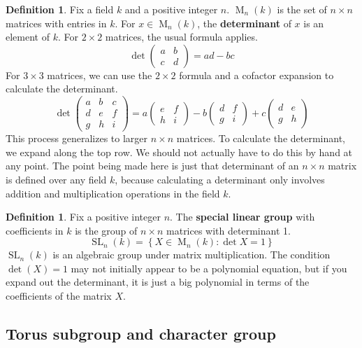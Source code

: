 \documentclass[12pt]{article}
\theoremstyle{definition}
\newtheorem{definition}[theorem]{Definition}
\numberwithin{theorem}{subsection}
\newcommand{\lb}{\left\{}
\newcommand{\rb}{\right\}}
\newcommand{\tbf}{\textbf}
\DeclareMathOperator{\M}{M}
\DeclareMathOperator{\SL}{SL}
\begin{document}
\begin{definition}
Fix a field $k$ and a positive integer $n$. $\M_n(k)$ is the set of $n \times n$ matrices with entries in $k$. For $x \in \M_n(k)$, the \tbf{determinant} of $x$ is an element of $k$. For $2 \times 2$ matrices, the usual formula applies.
\[
	\det
	\begin{pmatrix}
		a & b \\
		c & d
	\end{pmatrix}
	= ad - bc
\]
For $3 \times 3$ matrices, we can use the $2 \times 2$ formula and a cofactor expansion to calculate the determinant.
\[
	\det
	\begin{pmatrix}
		a & b & c \\
		d & e & f \\
		g & h & i
	\end{pmatrix}
	= a
	\begin{pmatrix}
		e & f \\
		h & i
	\end{pmatrix}
	-
	b
	\begin{pmatrix}
		d & f \\
		g & i
	\end{pmatrix}
	+ c
	\begin{pmatrix}
		d & e \\
		g & h
	\end{pmatrix}
\]
This process generalizes to larger $n \times n$ matrices. To calculate the determinant, we expand along the top row. We should not actually have to do this by hand at any point. The point being made here is just that determinant of an $n \times n$ matrix is defined over any field $k$, because calculating a determinant only involves addition and multiplication operations in the field $k$.
\end{definition}

\begin{definition}
Fix a positive integer $n$. The \tbf{special linear group} with coefficients in $k$ is the group of $n \times n$ matrices with determinant 1.
\[
	\SL_n(k) = \lb X \in \M_n(k) : \det X = 1 \rb
\]
$\SL_n(k)$ is an algebraic group under matrix multiplication. The condition $\det(X) = 1$ may not initially appear to be a polynomial equation, but if you expand out the determinant, it is just a big polynomial in terms of the coefficients of the matrix $X$.
\end{definition}

\subsection{Torus subgroup and character group}
\end{document}
